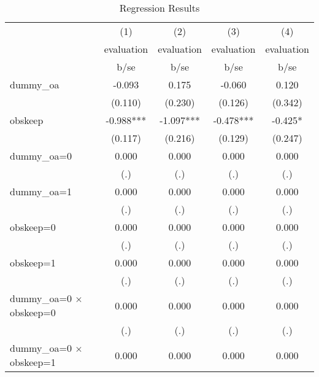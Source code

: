 \begin{table}[htbp]\centering
\def\sym#1{\ifmmode^{#1}\else\(^{#1}\)\fi}
\caption{Regression Results}
\begin{tabular}{l*{4}{c}}
\hline\hline
                    &\multicolumn{1}{c}{(1)}&\multicolumn{1}{c}{(2)}&\multicolumn{1}{c}{(3)}&\multicolumn{1}{c}{(4)}\\
                    &\multicolumn{1}{c}{evaluation}&\multicolumn{1}{c}{evaluation}&\multicolumn{1}{c}{evaluation}&\multicolumn{1}{c}{evaluation}\\
                    &        b/se   &        b/se   &        b/se   &        b/se   \\
\hline
dummy\_oa            &      -0.093   &       0.175   &      -0.060   &       0.120   \\
                    &     (0.110)   &     (0.230)   &     (0.126)   &     (0.342)   \\
obskeep             &      -0.988***&      -1.097***&      -0.478***&      -0.425*  \\
                    &     (0.117)   &     (0.216)   &     (0.129)   &     (0.247)   \\
dummy\_oa=0          &       0.000   &       0.000   &       0.000   &       0.000   \\
                    &         (.)   &         (.)   &         (.)   &         (.)   \\
dummy\_oa=1          &       0.000   &       0.000   &       0.000   &       0.000   \\
                    &         (.)   &         (.)   &         (.)   &         (.)   \\
obskeep=0           &       0.000   &       0.000   &       0.000   &       0.000   \\
                    &         (.)   &         (.)   &         (.)   &         (.)   \\
obskeep=1           &       0.000   &       0.000   &       0.000   &       0.000   \\
                    &         (.)   &         (.)   &         (.)   &         (.)   \\
dummy\_oa=0 $\times$ obskeep=0&       0.000   &       0.000   &       0.000   &       0.000   \\
                    &         (.)   &         (.)   &         (.)   &         (.)   \\
dummy\_oa=0 $\times$ obskeep=1&       0.000   &       0.000   &       0.000   &       0.000   \\

\end{tabular}
\end{table}
